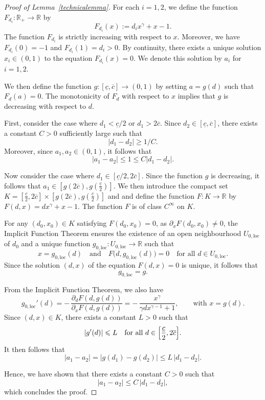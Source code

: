 \documentclass[10pt,a4paper]{amsart}
\renewcommand{\geq}{\geqslant}\renewcommand{\ge}{\geqslant}
\renewcommand{\leq}{\leqslant}\renewcommand{\le}{\leqslant}
\begin{document}
\begin{proof}[Proof of Lemma~\ref{technicalemma}]
For each $i =1,2$, we define the function $F_{d_i} : \mathbb{R}_+ \to \mathbb{R}$ by
\[
F_{d_i}(x) := d_i x^\gamma + x - 1.
\]
The function $F_{d_i}$ is strictly increasing with respect to $x$. Moreover, we have
$F_{d_i}(0) = -1$ and $F_{d_i}(1) = d_i > 0$.
By continuity, there exists a unique solution $x_i \in (0,1)$ to the equation
$F_{d_i}(x) = 0$.
We denote this solution by $a_i$ for $i = 1,2$.

We then define the function $g:[\underline{c},\overline{c}]\to (0,1)$ by setting $a = g(d)$ such that $F_d(a)=0$. The monotonicity of $F_{d}$ with respect to $x$ implies that $g$ is decreasing with respect to $d$.

First, consider the case where $d_1 < \underline{c}/2$ or $d_1 > 2\overline{c}$. Since $d_2 \in [\underline{c}, \overline{c}]$, there exists a constant $C > 0$ sufficiently large such that
\[
|d_1 - d_2| \geq 1/C.
\]
Moreover, since $a_1, a_2 \in (0,1)$, it follows that
\[
|a_1 - a_2| \leq 1 \leq C |d_1 - d_2|.
\]

Now consider the case where $d_1 \in [\underline{c}/2,2 \overline{c}]$. Since the function $g$ is decreasing, it follows that $a_1 \in [g(2 \overline{c}), g(\frac{\underline{c}}{2})]$. We then introduce the compact set $K = [\frac{\underline{c}}{2},2 \overline{c}] \times [g(2 \overline{c}), g(\frac{\underline{c}}{2})]$ and and define the function $F: K \to \mathbb{R}$ by $F(d,x) = d x^\gamma +x-1$. The function $F$ is of class $C^\infty$ on $K$.

For any $(d_0,x_0) \in K$ satisfying $F(d_0,x_0)=0$, as $\partial_x F(d_0,x_0) \neq 0$, the Implicit Function Theorem ensures the existence of an open neighbourhood $U_{0,\mathrm{loc}}$ of $d_0$ and a unique function $g_{0,\mathrm{loc}} : U_{0,\mathrm{loc}} \to \mathbb{R}$ such that
\[
x = g_{0,\mathrm{loc}}(d)
\quad \text{and} \quad
F\bigl(d, g_{0,\mathrm{loc}}(d)\bigr)=0
\quad \text{for all } d \in U_{0,\mathrm{loc}}.
\]
Since the solution $(d,x)$ of the equation $F(d,x)=0$ is unique, it follows that
\[
g_{0,\mathrm{loc}} = g.
\]


From the Implicit Function Theorem, we also have
\[
g_{0,\mathrm{loc}}'(d) = -\,\frac{\partial_d F(d,g(d))}{\partial_x F(d,g(d))} = -\,\frac{x^\gamma}{\gamma d x^{\gamma-1}+1}, \qquad \text{with } x = g(d).
\]
Since $(d,x) \in K$, there exists a constant $L>0$ such that
\[
\left| g'(d) \right| \le L \quad \text{for all } d \in \Bigl[\frac{\underline{c}}{2},2 \overline{c}\Bigr].
\]
It then follows that
\begin{equation*}
 |a_1 - a_2| = |g(d_1) - g(d_2)| \le L\, |d_1 - d_2|.
\end{equation*}

Hence, we have shown that there exists a constant $C>0$ such that
\[
|a_1 - a_2| \le C\, |d_1 - d_2|,
\]
which concludes the proof.


\end{proof}
\end{document}
